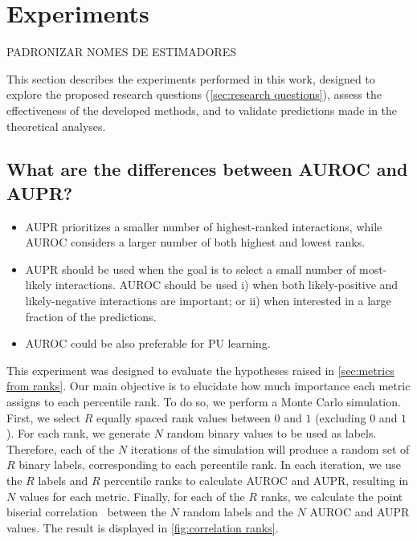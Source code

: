 \section{Experiments}
\label{sec:experiments}

PADRONIZAR NOMES DE ESTIMADORES  %

This section describes the experiments performed in this work, designed to explore the proposed research questions (\autoref{sec:research questions}), assess the effectiveness of the developed methods, and to validate predictions made in the theoretical analyses.



\subsection{What are the differences between AUROC and AUPR?}
\label{sec:comparing auroc aupr}

\begin{mdframed}[frametitle={Key findings}]
    \begin{itemize}
        \item AUPR prioritizes a smaller number of highest-ranked interactions, while AUROC considers a larger number of both highest and lowest ranks.
        \item AUPR should be used when the goal is to select a small number of most-likely interactions. AUROC should be used i) when both likely-positive and likely-negative interactions are important; or ii) when interested in a large fraction of the predictions.
        \item AUROC could be also preferable for PU learning.
    \end{itemize}
\end{mdframed}

This experiment was designed to evaluate the hypotheses raised in \autoref{sec:metrics from ranks}. Our main objective is to elucidate how much importance each metric assigns to each percentile rank. To do so, we perform a Monte Carlo simulation. First, we select $R$ equally spaced rank values between $0$ and $1$ (excluding $0$ and $1$). For each rank, we generate $N$ random binary values to be used as labels. Therefore, each of the $N$ iterations of the simulation will produce a random set of $R$ binary labels, corresponding to each percentile rank. In each iteration, we use the $R$ labels and $R$ percentile ranks to calculate AUROC and AUPR, resulting in $N$ values for each metric. Finally, for each of the $R$ ranks, we calculate the point biserial correlation~\cite{kornbrot2014point} between the $N$ random labels and the $N$ AUROC and AUPR values. The result is displayed in \autoref{fig:correlation ranks}.

